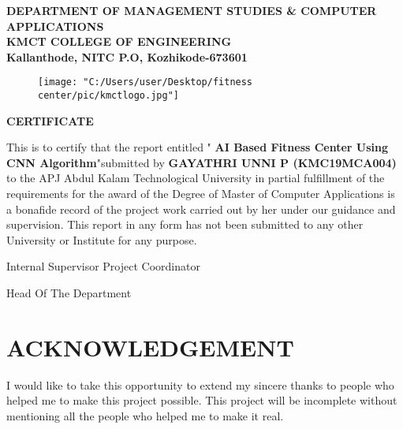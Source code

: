 \documentclass[a4paper,12pt,toc=flat]{report}
\begin{document}
	\pagebreak
	\begin{center}
		
		\textbf{
			\vspace*{8pt}
			DEPARTMENT OF MANAGEMENT STUDIES \& COMPUTER
			\vspace*{8pt}
			APPLICATIONS\\
			KMCT COLLEGE OF ENGINEERING\\
			\vspace*{8pt}
			Kallanthode, NITC P.O, Kozhikode-673601
		}
		
		\begin{figure}[bph]
			\centering
			\texttt{[image: "C:/Users/user/Desktop/fitness center/pic/kmctlogo.jpg"]}
			\label{fig:ksblogo}
		\end{figure}
	\end{center}
	{\centering \bf \large
		CERTIFICATE\par
	}
	\vspace*{10pt}
	This is to certify that the report entitled "{\bf 
		AI Based Fitness Center Using CNN Algorithm}"submitted
	by {\bf GAYATHRI UNNI P (KMC19MCA004)}
	to the APJ Abdul Kalam Technological University
	in partial fulfillment of the requirements for the award of the Degree of Master of Computer
	Applications is a bonafide record of the project work carried out by her under our guidance and
	supervision. This report in any form has not been submitted to any other University or Institute for
	any purpose.
	
	\begin{center}\vspace*{20pt}
		Internal Supervisor \hspace*{0pt} \hfill  Project Coordinator
	\end{center}
	
	\begin{center}\vspace*{40pt}
		\hspace*{0pt} \hfill  Head Of The Department
	\end{center}
	\pagebreak
	\section*{\centering \bf \large ACKNOWLEDGEMENT}
	
	
	\vspace*{20pt}I would like to take this opportunity to extend my sincere thanks to people who helped me to make
	this project possible. This project will be incomplete without mentioning all the people who helped
	me to make it real.\\
	
\end{document}
